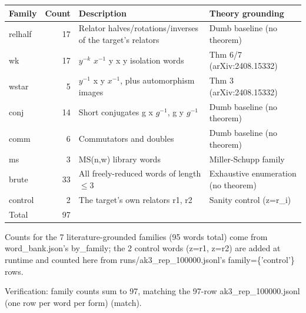 \begin{tabular}{@{}lr p{} p{}@{}}
\toprule
Family & Count & Description & Theory grounding \\
\midrule
relhalf & 17 & Relator halves/rotations/inverses of the target's relators & Dumb baseline (no theorem) \\
wk & 17 & $y^{-k}$ $x^{-1}$ y x y isolation words & Thm 6/7 (arXiv:2408.15332) \\
wstar & 5 & $y^{-1}$ x y $x^{-1}$, plus automorphism images & Thm 3 (arXiv:2408.15332) \\
conj & 14 & Short conjugates g x $g^{-1}$, g y $g^{-1}$ & Dumb baseline (no theorem) \\
comm & 6 & Commutators and doubles & Dumb baseline (no theorem) \\
ms & 3 & MS(n,w) library words & Miller-Schupp family \\
brute & 33 & All freely-reduced words of length $\le$3 & Exhaustive enumeration (no theorem) \\
control & 2 & The target's own relators r1, r2 & Sanity control (z=r\_i) \\
Total & 97 &  &  \\
\bottomrule
\end{tabular}

\vspace{2pt}
{\footnotesize
Counts for the 7 literature-grounded families (95 words total) come from word\_bank.json's by\_family; the 2 control words (z=r1, z=r2) are added at runtime and counted here from runs/ak3\_rep\_100000.jsonl's family=\{'control'\} rows.\par
Verification: family counts sum to 97, matching the 97-row ak3\_rep\_100000.jsonl (one row per word per form) (match).\par
}

